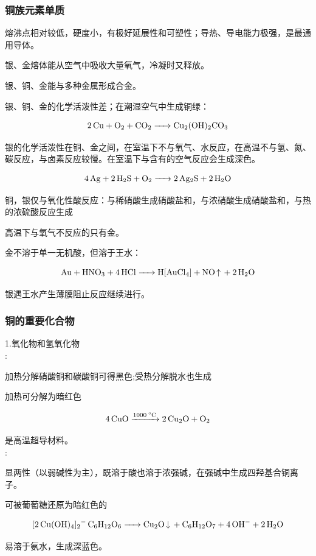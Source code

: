 \documentclass[a4paper,UTF8]{article}
\begin{document}
\subsubsection{铜族元素单质}
熔沸点相对较低，硬度小，有极好延展性和可塑性；导热、导电能力极强，是最通用导体。

银、金熔体能从空气中吸收大量氧气，冷凝时又释放。

银、铜、金能与多种金属形成合金。

银、铜、金的化学活泼性差；在潮湿空气中生成铜绿：

$$ \ce{2Cu + O2 + CO2 -> Cu2(OH)2CO3} $$

银的化学活泼性在铜、金之间，在室温下不与氧气、水反应，在高温不与氢、氮、碳反应，与卤素反应较慢。在室温下与含有的空气反应会生成深色。

$$ \ce{4Ag + 2H2S + O2 -> 2Ag2S + 2H2O} $$

铜，银仅与氧化性酸反应：与稀硝酸生成硝酸盐和，与浓硝酸生成硝酸盐和，与热的浓硫酸反应生成

高温下与氧气不反应的只有金。

金不溶于单一无机酸，但溶于王水：

$$ \ce{Au + HNO3 + 4HCl ->H[AuCl4] + NO\ce{^} + 2H2O} $$

银遇王水产生薄膜阻止反应继续进行。

\subsubsection{铜的重要化合物}
1.氧化物和氢氧化物\\

:

加热分解硝酸铜和碳酸铜可得黑色;受热分解脱水也生成

加热可分解为暗红色

$$ \ce{4CuO ->[1000^\circ C] 2Cu2O + O2} $$

是高温超导材料。\\

:

显两性（以弱碱性为主），既溶于酸也溶于浓强碱，在强碱中生成四羟基合铜离子。

可被葡萄糖还原为暗红色的

$$ \ce{[2Cu(OH)4]2- C6H12O6 -> Cu2O\ce{v} + C6H12O7 + 4OH- + 2H2O} $$

易溶于氨水，生成深蓝色。\\
\end{document}

